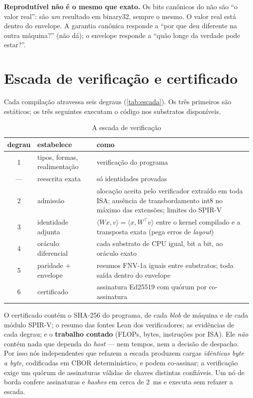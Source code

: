 \begin{graduacao}
\textbf{Reprodutível não é o mesmo que exato.} Os bits canônicos do \vapor{} não são ``o valor real'': são \emph{um} resultado em binary32, sempre o mesmo. O valor real está dentro do envelope. A garantia canônica responde a ``por que deu diferente na outra máquina?'' (não dá); o envelope responde a ``quão longe da verdade pode estar?''.
\end{graduacao}

\section{Escada de verificação e certificado}\label{sec:arq-escada}

Cada compilação atravessa seis degraus (\autoref{tab:escada}). Os três primeiros são estáticos; os três seguintes executam o código nos substratos disponíveis.

\begin{table}[htbp]
\centering
\caption{A escada de verificação}\label{tab:escada}
\small
\begin{tabularx}{\textwidth}{@{}clX@{}}
\toprule
\textbf{degrau} & \textbf{estabelece} & \textbf{como}\\
\midrule
1 & tipos, formas, realimentação & verificação do programa\\
--- & reescrita exata & só identidades provadas\\
2 & admissão & alocação aceita pelo verificador extraído em toda ISA; ausência de transbordamento int8 no máximo das extensões; limites do SPIR-V\\
3 & identidade adjunta & $\langle Wx, v\rangle = \langle x, W^\top v\rangle$ entre o kernel compilado e a transposta exata (pega erros de \textit{layout})\\
4 & oráculo diferencial & cada substrato de CPU igual, bit a bit, ao oráculo exato\\
5 & paridade + envelope & resumos FNV-1a iguais entre substratos; toda saída dentro do envelope\\
6 & certificado & assinatura Ed25519 com quórum por co-assinatura\\
\bottomrule
\end{tabularx}
\end{table}

O certificado contém o SHA-256 do programa, de cada \textit{blob} de máquina e de cada módulo SPIR-V; o resumo das fontes Lean dos verificadores; as evidências de cada degrau; e o \textbf{trabalho contado} (FLOPs, bytes, instruções por ISA). Ele \emph{não} contém nada que dependa do \textit{host} --- nem tempos, nem a decisão de despacho. Por isso nós independentes que refazem a escada produzem cargas \emph{idênticas byte a byte}, codificadas em CBOR determinístico, e podem co-assinar; a verificação exige um quórum de assinaturas válidas de chaves distintas confiáveis. Um nó de borda confere assinaturas e \textit{hashes} em cerca de 2~ms e executa sem refazer a escada.

